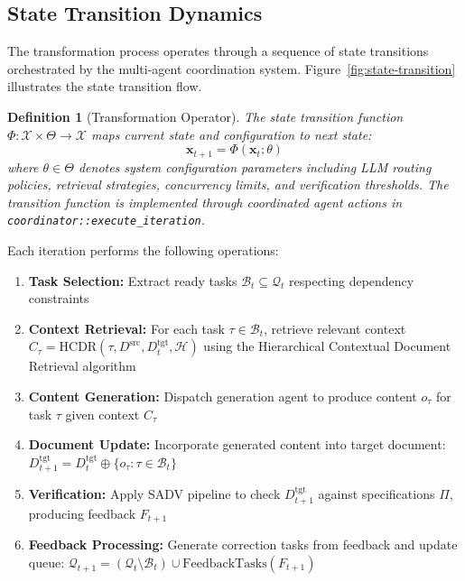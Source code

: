 \documentclass{ieeeaccess}
\newtheorem{definition}{Definition}
\begin{document}
\subsection{State Transition Dynamics}

The transformation process operates through a sequence of state transitions orchestrated by the multi-agent coordination system. Figure~\ref{fig:state-transition} illustrates the state transition flow.

\begin{definition}[Transformation Operator]
The state transition function \(\Phi: \mathcal{X} \times \Theta \to \mathcal{X}\) maps current state and configuration to next state:
\begin{equation}
\mathbf{x}_{t+1} = \Phi(\mathbf{x}_t; \theta)
\label{eq:state-transition}
\end{equation}
where \(\theta \in \Theta\) denotes system configuration parameters including LLM routing policies, retrieval strategies, concurrency limits, and verification thresholds. The transition function is implemented through coordinated agent actions in \texttt{coordinator::execute\_iteration}.
\end{definition}

Each iteration performs the following operations:
\begin{enumerate}
\item \textbf{Task Selection:} Extract ready tasks \(\mathcal{B}_t \subseteq \mathcal{Q}_t\) respecting dependency constraints
\item \textbf{Context Retrieval:} For each task \(\tau \in \mathcal{B}_t\), retrieve relevant context \(C_\tau = \text{HCDR}(\tau, D^{\text{src}}, D^{\text{tgt}}_t, \mathcal{H})\) using the Hierarchical Contextual Document Retrieval algorithm
\item \textbf{Content Generation:} Dispatch generation agent to produce content \(o_\tau\) for task \(\tau\) given context \(C_\tau\)
\item \textbf{Document Update:} Incorporate generated content into target document: \(D^{\text{tgt}}_{t+1} = D^{\text{tgt}}_t \oplus \{o_\tau : \tau \in \mathcal{B}_t\}\)
\item \textbf{Verification:} Apply SADV pipeline to check \(D^{\text{tgt}}_{t+1}\) against specifications \(\Pi\), producing feedback \(F_{t+1}\)
\item \textbf{Feedback Processing:} Generate correction tasks from feedback and update queue: \(\mathcal{Q}_{t+1} = (\mathcal{Q}_t \setminus \mathcal{B}_t) \cup \text{FeedbackTasks}(F_{t+1})\)
\end{enumerate}
\end{document}
